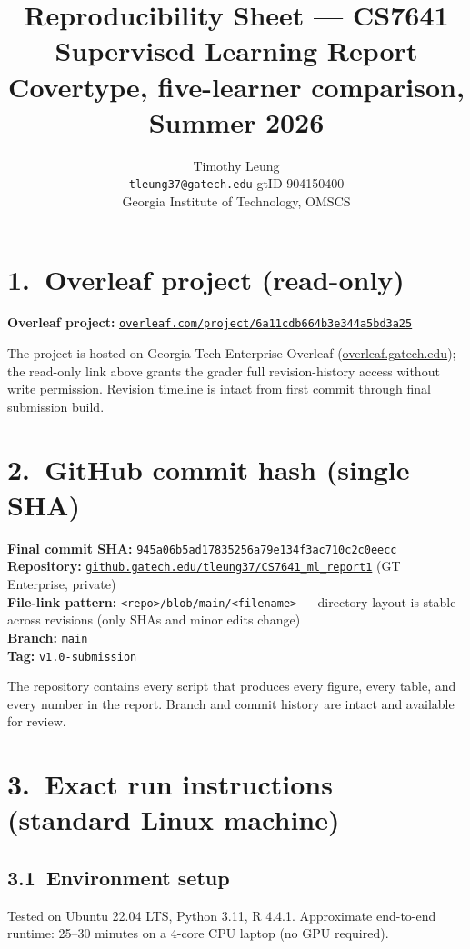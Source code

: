 \documentclass[11pt]{article}
\title{\color{denimdark}\textbf{Reproducibility Sheet --- CS7641 Supervised Learning Report}\\
       \large Covertype, five-learner comparison, Summer 2026}
\author{Timothy Leung \\ \texttt{tleung37@gatech.edu} \quad gtID 904150400 \\
        Georgia Institute of Technology, OMSCS}
\date{}
\begin{document}
\maketitle
\thispagestyle{fancy}

\section*{1.\ Overleaf project (read-only)}
\textbf{Overleaf project:} \href{https://www.overleaf.com/project/6a11cdb664b3e344a5bd3a25}{\texttt{overleaf.com/project/6a11cdb664b3e344a5bd3a25}}

The project is hosted on Georgia Tech Enterprise Overleaf
(\href{https://overleaf.gatech.edu}{overleaf.gatech.edu}); the read-only link
above grants the grader full revision-history access without write
permission. Revision timeline is intact from first commit through final
submission build.

\section*{2.\ GitHub commit hash (single SHA)}
\textbf{Final commit SHA:} \texttt{945a06b5ad17835256a79e134f3ac710c2c0eecc}\\
\textbf{Repository:} \href{https://github.gatech.edu/tleung37/CS7641_ml_report1}{\texttt{github.gatech.edu/tleung37/CS7641\_ml\_report1}} (GT Enterprise, private)\\
\textbf{File-link pattern:} \texttt{<repo>/blob/main/<filename>} --- directory layout is stable across revisions (only SHAs and minor edits change)\\
\textbf{Branch:} \texttt{main}\\
\textbf{Tag:} \texttt{v1.0-submission}

The repository contains every script that produces every figure, every
table, and every number in the report. Branch and commit history are intact
and available for review.

\section*{3.\ Exact run instructions (standard Linux machine)}

\subsection*{3.1\ Environment setup}
Tested on Ubuntu 22.04 LTS, Python 3.11, R 4.4.1. Approximate end-to-end
runtime: 25--30 minutes on a 4-core CPU laptop (no GPU required).
\end{document}
